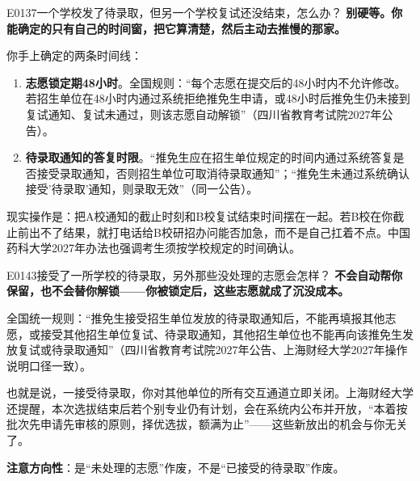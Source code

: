 \begin{qa}{E0137}{一个学校发了待录取，但另一个学校复试还没结束，怎么办？}
\textbf{别硬等。你能确定的只有自己的时间窗，把它算清楚，然后主动去推慢的那家。}

你手上确定的两条时间线：

\begin{enumerate}
  \item \textbf{志愿锁定期48小时}。全国规则：“每个志愿在提交后的48小时内不允许修改。若招生单位在48小时内通过系统拒绝推免生申请，或48小时后推免生仍未接到复试通知、复试未通过，则该志愿自动解锁”（四川省教育考试院2027年公告）。
  \item \textbf{待录取通知的答复时限}。“推免生应在招生单位规定的时间内通过系统答复是否接受录取通知，否则招生单位可取消待录取通知”；“推免生未通过系统确认接受'待录取'通知，则录取无效”（同一公告）。
\end{enumerate}

现实操作是：把A校通知的截止时刻和B校复试结束时间摆在一起。若B校在你截止前出不了结果，就打电话给B校研招办问能否加急，而不是自己扛着不点。中国药科大学2027年办法也强调考生须按学校规定的时间确认。
\end{qa}

\begin{qa}{E0143}{接受了一所学校的待录取，另外那些没处理的志愿会怎样？}
\textbf{不会自动帮你保留，也不会替你解锁——你被锁定后，这些志愿就成了沉没成本。}

全国统一规则：“推免生接受招生单位发放的待录取通知后，不能再填报其他志愿，或接受其他招生单位复试、待录取通知，其他招生单位也不能再向该推免生发放复试或待录取通知”（四川省教育考试院2027年公告、上海财经大学2027年操作说明口径一致）。

也就是说，一接受待录取，你对其他单位的所有交互通道立即关闭。上海财经大学还提醒，本次选拔结束后若个别专业仍有计划，会在系统内公布并开放，“本着按批次先申请先审核的原则，择优选拔，额满为止”——这些新放出的机会与你无关了。

\textbf{注意方向性}：是“未处理的志愿”作废，不是“已接受的待录取”作废。
\end{qa}

